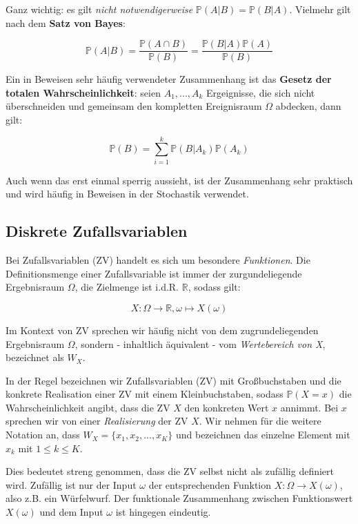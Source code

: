 \documentclass[]{book}
\begin{document}
Ganz wichtig: es gilt \emph{nicht notwendigerweise}
\(\mathbb{P}(A|B)=\mathbb{P}(B|A)\). Vielmehr gilt nach dem \textbf{Satz
von Bayes}:

\[\mathbb{P}(A|B)=\frac{\mathbb{P}(A\cap B)}{\mathbb{P}(B)}=\frac{\mathbb{P}(B|A)\mathbb{P}(A)}{\mathbb{P}(B)}\]

Ein in Beweisen sehr häufig verwendeter Zusammenhang ist das
\textbf{Gesetz der totalen Wahrscheinlichkeit}: seien \(A_1,...,A_k\)
Ergeignisse, die sich nicht überschneiden und gemeinsam den kompletten
Ereignisraum \(\Omega\) abdecken, dann gilt:

\[\mathbb{P}(B)=\sum_{i=1}^k\mathbb{P}(B|A_k)\mathbb{P}(A_k)\]

Auch wenn das erst einmal sperrig aussieht, ist der Zusammenhang sehr
praktisch und wird häufig in Beweisen in der Stochastik verwendet.

\subsection{Diskrete Zufallsvariablen}\label{diskrete-zufallsvariablen}

Bei Zufallsvariablen (ZV) handelt es sich um besondere
\emph{Funktionen}. Die Definitionsmenge einer Zufallsvariable ist immer
der zurgundeliegende Ergebnisraum \(\Omega\), die Zielmenge ist i.d.R.
\(\mathbb{R}\), sodass gilt:

\[X:\Omega\rightarrow\mathbb{R}, \omega \mapsto X(\omega)\]

Im Kontext von ZV sprechen wir häufig nicht von dem zugrundeliegenden
Ergebnisraum \(\Omega\), sondern - inhaltlich äquivalent - vom
\emph{Wertebereich von X}, bezeichnet als \(W_X\).

In der Regel bezeichnen wir Zufallsvariablen (ZV) mit Großbuchstaben und
die konkrete Realisation einer ZV mit einem Kleinbuchstaben, sodass
\(\mathbb{P}(X=x)\) die Wahrscheinlichkeit angibt, dass die ZV \(X\) den
konkreten Wert \(x\) annimmt. Bei \(x\) sprechen wir von einer
\emph{Realisierung} der ZV \(X\). Wir nehmen für die weitere Notation
an, dass \(W_X=\{x_1, x_2,...,x_K\}\) und bezeichnen das einzelne
Element mit \(x_k\) mit \(1\leq k\leq K\).

Dies bedeutet streng genommen, dass die ZV selbst nicht als zufällig
definiert wird. Zufällig ist nur der Input \(\omega\) der entsprechenden
Funktion \(X: \Omega\rightarrow X(\omega)\), also z.B. ein Würfelwurf.
Der funktionale Zusammenhang zwischen Funktionswert \(X(\omega)\) und
dem Input \(\omega\) ist hingegen eindeutig.
\end{document}
